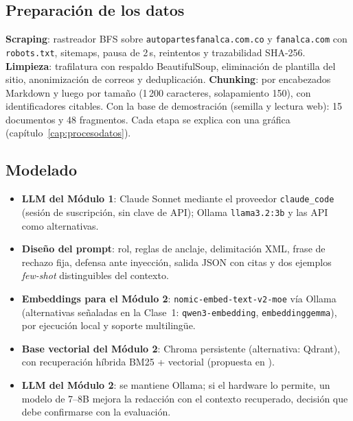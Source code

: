 \subsection*{Preparación de los datos}
\textbf{Scraping}: rastreador BFS sobre \texttt{autopartesfanalca.com.co} y \texttt{fanalca.com} con \texttt{robots.txt}, sitemaps, pausa de 2\,s,
reintentos y trazabilidad SHA-256. \textbf{Limpieza}: trafilatura con respaldo BeautifulSoup, eliminación de
plantilla del sitio, anonimización de correos y deduplicación. \textbf{Chunking}: por encabezados Markdown y luego
por tamaño (1\,200 caracteres, solapamiento 150), con identificadores citables. Con la base de demostración
(semilla y lectura web): 15 documentos y 48 fragmentos. Cada etapa se explica con una gráfica
(capítulo~\ref{cap:procesodatos}).

\subsection*{Modelado}
\begin{itemize}
  \item \textbf{LLM del Módulo 1}: Claude Sonnet mediante el proveedor \texttt{claude\_code} (sesión de
        suscripción, sin clave de API); Ollama \texttt{llama3.2:3b} y las API como alternativas.
  \item \textbf{Diseño del prompt}: rol, reglas de anclaje, delimitación XML, frase de rechazo fija, defensa ante
        inyección, salida JSON con citas y dos ejemplos \emph{few-shot} distinguibles del contexto.
  \item \textbf{Embeddings para el Módulo 2}: \texttt{nomic-embed-text-v2-moe} vía Ollama (alternativas
        señaladas en la Clase~1: \texttt{qwen3-embedding}, \texttt{embeddinggemma}), por ejecución local y soporte
        multilingüe.
  \item \textbf{Base vectorial del Módulo 2}: Chroma persistente (alternativa: Qdrant), con recuperación híbrida
        BM25 + vectorial (propuesta en ).
  \item \textbf{LLM del Módulo 2}: se mantiene Ollama; si el hardware lo permite, un modelo de 7--8B mejora la
        redacción con el contexto recuperado, decisión que debe confirmarse con la evaluación.
\end{itemize}

